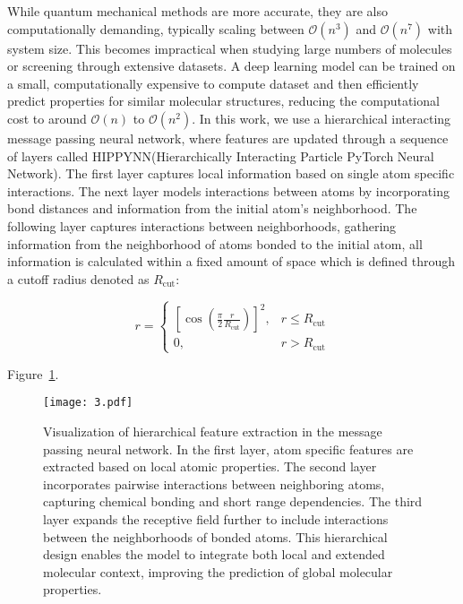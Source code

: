 \documentclass[journal=jctcce,manuscript=article]{achemso}
\begin{document}
While quantum mechanical methods are more accurate, they are also computationally demanding, typically scaling between \( \mathcal{O}(n^3) \) and \( \mathcal{O}(n^7) \) with system size. This becomes impractical when studying large numbers of molecules or screening through extensive datasets. A deep learning model can be trained on a small, computationally expensive to compute dataset and then efficiently predict properties for similar molecular structures, reducing the computational cost to around \( \mathcal{O}(n) \) to \( \mathcal{O}(n^2) \). In this work, we use a hierarchical interacting message passing neural network, where features are updated through a sequence of layers called HIPPYNN(Hierarchically Interacting Particle PyTorch Neural Network). The first layer captures local information based on single atom specific interactions. The next layer models interactions between atoms by incorporating bond distances and information from the initial atom's neighborhood. The following layer captures interactions between neighborhoods, gathering information from the neighborhood of atoms bonded to the initial atom, all information is calculated within a fixed amount of space  which is defined through a cutoff radius denoted as \( R_{\text{cut}} \):

\[
r =
\begin{cases}
\left[ \cos\left( \frac{\pi}{2} \frac{r}{R_{\text{cut}}} \right) \right]^2, & r \leq R_{\text{cut}} \\
0, & r > R_{\text{cut}}
\end{cases}
\]


Figure~\ref{fig:Davidson_flowchart}.

\begin{figure}[hptb]
    \centering
    \texttt{[image: 3.pdf]}
    \caption{
    Visualization of hierarchical feature extraction in the message passing neural network. In the first layer, atom specific features are extracted based on local atomic properties. The second layer incorporates pairwise interactions between neighboring atoms, capturing chemical bonding and short range dependencies. The third layer expands the receptive field further to include interactions between the neighborhoods of bonded atoms. This hierarchical design enables the model to integrate both local and extended molecular context, improving the prediction of global molecular properties.
    }

    \label{fig:Davidson_flowchart}
\end{figure}
\end{document}
